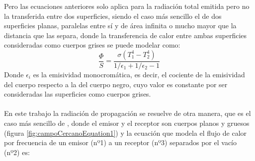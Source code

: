  Pero las ecuaciones anteriores solo aplica para la radiación total emitida pero no la transferida entre dos superficies, siendo el caso más sencillo el de dos superficies planas, paralelas entre sí y de área infinita o mucho mayor que la distancia que las separa, donde la transferencia de calor entre ambas superficies consideradas como cuerpos grises se puede modelar como:
\begin{equation}
\frac{\Phi}{S}=\frac{\sigma \left( T_1^4 -T_2^4 \right)}{1/\epsilon_1 +1/\epsilon_2 -1}
\label{eq:flujoCalorSuperficiesGrises}
\end{equation}
Donde $\epsilon_i$ es la emisividad monocromática, es decir, el cociente de la emisividad del cuerpo respecto a la del cuerpo negro, cuyo valor es constante por ser consideradas las superficies como cuerpos grises.\\\\
En este trabajo la radiación de propagación se resuelve de otra manera, que es el caso más sencillo de \cite{nfTPV_equations}, donde el emisor y el receptor son cuerpos planos y gruesos (figura \ref{fig:campoCercanoEquation1}) y la ecuación que modela el flujo de calor por frecuencia de un emisor (nº1) a un receptor (nº3) separados por el vacío (nº2) es:

